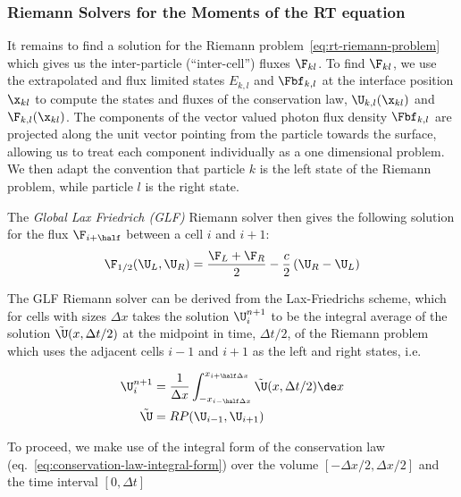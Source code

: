 \subsubsection{Riemann Solvers for the Moments of the RT equation}\label{chap:riemann-rt}

It remains to find a solution for the Riemann problem~\ref{eq:rt-riemann-problem} which gives us
the inter-particle (``inter-cell'') fluxes $\F_{kl}$.
To find $\F_{kl}$, we use the extrapolated and flux limited states $E_{k,l}$ and $\Fbf_{k,l}$ at the
interface position $\x_{kl}$ to compute the states and fluxes of the conservation law,
$\U_{k,l}(\x_{kl})$ and $\F_{k,l}(\x_{kl})$. The components of the vector valued photon flux density
$\Fbf_{k,l}$ are projected along the unit vector pointing from the particle towards the surface,
allowing us to treat each component individually as a one dimensional problem. We then adapt the
convention that particle $k$ is the left state of the Riemann problem, while particle $l$ is the
right state.

The \emph{Global Lax Friedrich (GLF)} Riemann solver \citep{ramses-rt13} then gives the
following solution for the flux $\F_{i+\half}$ between a cell $i$ and $i+1$:
\begin{equation}
	\F_{1/2}(\U_L, \U_R) =
		\frac{\F_{L} + \F_{R}}{2} -
		\frac{c}{2} \left(\U_R - \U_L \right) \label{eq:riemann-GLF}
\end{equation}

The GLF Riemann solver can be derived from the Lax-Friedrichs scheme, which for cells with sizes
$\Delta x$ takes the solution $\U_i^{n+1}$ to be the integral average of the solution
$\tilde{\U}(x, \Delta t/2)$ at the midpoint in time, $\Delta t/2$, of the Riemann problem which
uses the adjacent cells $i-1$ and $i+1$ as the left and right states, i.e.

\begin{align}
\U^{n+1}_i &=
    \frac{1}{\Delta x}
    \int_{-x_{i-\half \Delta x}}^{x_{i+\half \Delta x}} \tilde{\U}(x, \Delta t/2) \de x \\
\tilde{\U} &= RP(\U_{i-1}, \U_{i+1})
\end{align}

To proceed, we make use of the integral form of the conservation law
(eq.~\ref{eq:conservation-law-integral-form}) over the volume $[-\Delta x /2, \Delta x/2]$ and the
time interval $[0, \Delta t]$

